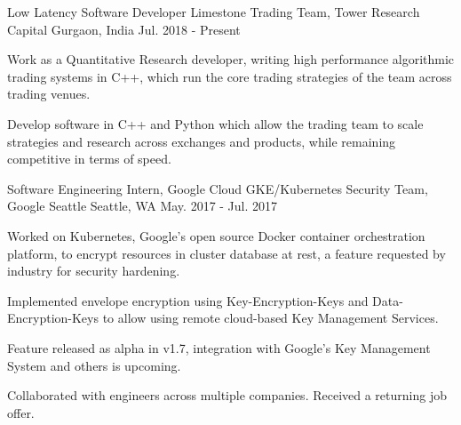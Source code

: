 
\vspace{-0.2cm}


\begin{cventries}

  \cventry
  {Low Latency Software Developer}
  {Limestone Trading Team, Tower Research Capital}
  {Gurgaon, India}
  {Jul. 2018 - Present}
  {
    \begin{cvitems}
    \setlength\itemsep{0.1cm}
    \item {Work as a Quantitative Research developer, writing high performance algorithmic trading systems in C++, which run the core trading strategies of the team across trading venues.}
    \item {Develop software in C++ and Python which allow the trading team to scale strategies and research across exchanges and products, while remaining competitive in terms of speed.}
    \end{cvitems}
  }

  \cventry
  {Software Engineering Intern, Google Cloud}
  {GKE/Kubernetes Security Team, Google Seattle}
  {Seattle, WA}
  {May. 2017 - Jul. 2017}
  {
    \begin{cvitems}
    \setlength\itemsep{0.1cm}
    \item {Worked on Kubernetes, Google's open source Docker container orchestration platform, to encrypt resources in cluster database at rest, a feature requested by industry for security hardening.}
    \item {Implemented envelope encryption using Key-Encryption-Keys and Data-Encryption-Keys to allow using remote cloud-based Key Management Services.}
    \item {Feature released as alpha in v1.7, integration with Google's Key Management System and others is upcoming.}
    \item {Collaborated with engineers across multiple companies. Received a returning job offer.}
    \end{cvitems}
  }


\end{cventries}
